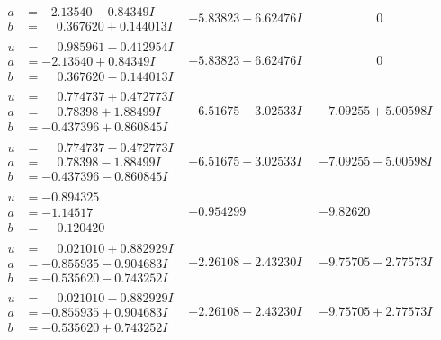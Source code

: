 \documentclass[1p]{elsarticle_modified}
\theoremstyle{definition}
\begin{document}
$$\begin{array}{c|c|c}
\begin{aligned}
a &= -2.13540 - 0.84349 I \\
b &= \phantom{-}0.367620 + 0.144013 I\end{aligned}
 & -5.83823 + 6.62476 I & \phantom{-0.000000 } 0 \\ \hline\begin{aligned}
u &= \phantom{-}0.985961 - 0.412954 I \\
a &= -2.13540 + 0.84349 I \\
b &= \phantom{-}0.367620 - 0.144013 I\end{aligned}
 & -5.83823 - 6.62476 I & \phantom{-0.000000 } 0 \\ \hline\begin{aligned}
u &= \phantom{-}0.774737 + 0.472773 I \\
a &= \phantom{-}0.78398 + 1.88499 I \\
b &= -0.437396 + 0.860845 I\end{aligned}
 & -6.51675 - 3.02533 I & -7.09255 + 5.00598 I \\ \hline\begin{aligned}
u &= \phantom{-}0.774737 - 0.472773 I \\
a &= \phantom{-}0.78398 - 1.88499 I \\
b &= -0.437396 - 0.860845 I\end{aligned}
 & -6.51675 + 3.02533 I & -7.09255 - 5.00598 I \\ \hline\begin{aligned}
u &= -0.894325\phantom{ +0.000000I} \\
a &= -1.14517\phantom{ +0.000000I} \\
b &= \phantom{-}0.120420\phantom{ +0.000000I}\end{aligned}
 & -0.954299\phantom{ +0.000000I} & -9.82620\phantom{ +0.000000I} \\ \hline\begin{aligned}
u &= \phantom{-}0.021010 + 0.882929 I \\
a &= -0.855935 - 0.904683 I \\
b &= -0.535620 - 0.743252 I\end{aligned}
 & -2.26108 + 2.43230 I & -9.75705 - 2.77573 I \\ \hline\begin{aligned}
u &= \phantom{-}0.021010 - 0.882929 I \\
a &= -0.855935 + 0.904683 I \\
b &= -0.535620 + 0.743252 I\end{aligned}
 & -2.26108 - 2.43230 I & -9.75705 + 2.77573 I \\ \hline\begin{aligned}

\end{aligned}
\end{array}$$
\end{document}
